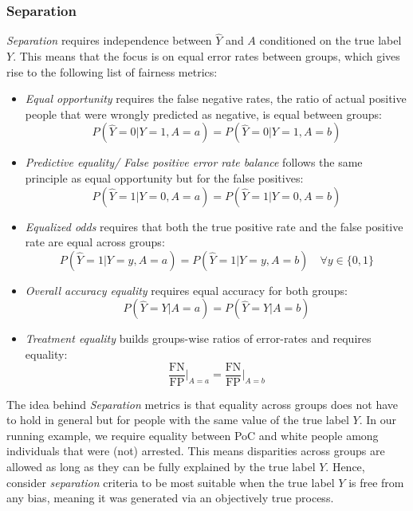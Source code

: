 \subsubsection*{Separation}
\textit{Separation} requires independence between $\hat{Y}$ and $A$ conditioned on the true label $Y$. This means that the focus is on equal error rates between groups, which gives rise to the following list of fairness metrics:
\begin{itemize}
    \item \textit{Equal opportunity} requires the false negative rates, the ratio of actual positive people that were wrongly predicted as negative, is equal between groups: $$P(\hat{Y} = 0 | Y = 1, A = a) = P(\hat{Y} = 0 | Y = 1, A = b)$$
    \item \textit{Predictive equality/ False positive error rate balance} follows the same principle as equal opportunity but for the false positives: $$P(\hat{Y} = 1 | Y = 0, A = a) = P(\hat{Y} = 1 | Y = 0, A = b)$$
    \item \textit{Equalized odds} requires that both the true positive rate and the false positive rate are equal across groups: $$P(\hat{Y} = 1 | Y = y, A = a) = P(\hat{Y} = 1 | Y = y, A = b) \quad \forall y \in \{0, 1\}$$ 
    \item \textit{Overall accuracy equality} requires equal accuracy for both groups: $$P(\hat{Y} = Y | A = a) = P(\hat{Y} = Y | A = b)$$ 
    \item \textit{Treatment equality} builds groups-wise ratios of error-rates and requires equality: $$\frac{\text{FN}}{\text{FP}} \big|_{A = a} = \frac{\text{FN}}{\text{FP}} \big|_{A = b}$$
\end{itemize}
The idea behind \textit{Separation} metrics is that equality across groups does not have to hold in general but for people with the same value of the true label $Y$. In our running example, we require equality between PoC and white people among individuals that were (not) arrested. 
This means disparities across groups are allowed as long as they can be fully explained by the true label $Y$. Hence, \cite{castelnovo2022} consider \textit{separation} criteria to be most suitable when the true label $Y$ is free from any bias, meaning it was generated via an objectively true process.

